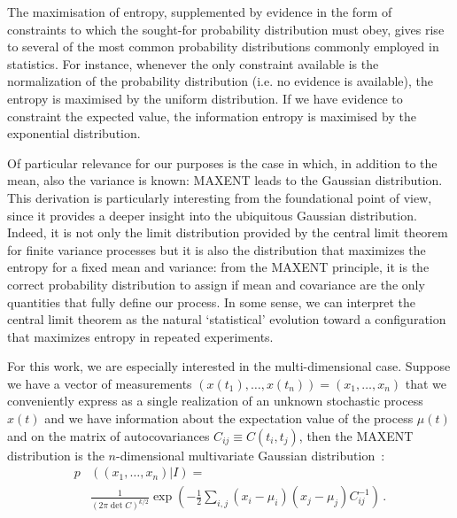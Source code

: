 \documentclass{aa}
\begin{document}
The maximisation of entropy, supplemented by evidence in the form of constraints to which the sought-for probability distribution must obey, gives rise to several of the most common probability distributions commonly employed in statistics. For instance, whenever the only constraint available is the normalization of the probability distribution (i.e. no evidence is available), the entropy is maximised by the uniform distribution. If we have evidence to constraint the expected value, the information entropy is maximised by the exponential distribution.

Of particular relevance for our purposes is the case in which, in addition to the mean, also the variance is known: MAXENT leads to the Gaussian distribution. 
This derivation is particularly interesting from the foundational point of view, since it provides a deeper insight into the ubiquitous Gaussian distribution.
Indeed, it is not only the limit distribution provided by the central limit theorem for finite variance processes but it is also the distribution that maximizes the entropy for a fixed mean and variance: from the MAXENT principle, it is the correct probability distribution to assign if mean and covariance are the only quantities that fully define our process. In some sense, we can interpret the central limit theorem as the natural `statistical' evolution toward a configuration that maximizes entropy in repeated experiments.

For this work, we are especially interested in the multi-dimensional case. Suppose we have a vector of measurements $(x(t_1),\ldots,x(t_n)) = (x_1, \ldots, x_n)$ that we conveniently express as a single realization of an unknown stochastic process $x(t)$ and we have information about the expectation value of the process $\mu(t)$ and on the matrix of autocovariances $C_{ij} \equiv C(t_i,t_j)$, then the MAXENT distribution is the $n$-dimensional multivariate Gaussian distribution~\citep{gregory_2005}: 
\begin{align}
    p&\left((x_1, \ldots, x_n)\vert I\right) = \nonumber \\
    &\frac{1}{\left(2 \pi \det C\right)^{k / 2}}\exp\left(-\frac{1}{2}\sum_{i,j}(x_i-\mu_i) (x_j-\mu_j)C^{-1}_{ij} \right)\,. 
\end{align}
\end{document}
